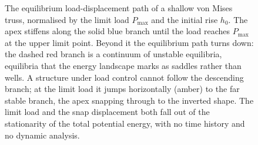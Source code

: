 \begin{figure}[htbp]
\caption[Load-displacement path of a shallow snap-through truss]{The
equilibrium load-displacement path of a shallow von Mises truss, normalised
by the limit load $P_\mathrm{max}$ and the initial rise $h_0$. The apex
stiffens along the solid blue branch until the load reaches $P_\mathrm{max}$
at the upper limit point. Beyond it the equilibrium path turns down: the
dashed red branch is a continuum of unstable equilibria, equilibria that the
energy landscape marks as saddles rather than wells. A structure under load
control cannot follow the descending branch; at the limit load it jumps
horizontally (amber) to the far stable branch, the apex snapping through to
the inverted shape. The limit load and the snap displacement both fall out
of the stationarity of the total potential energy, with no time history and
no dynamic analysis.}
\label{fig:vol03ch05:snap-load-path}
\end{figure}
